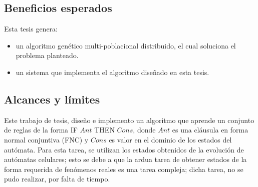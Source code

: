 \subsection{Beneficios esperados}
Esta tesis genera:
\begin{itemize}
	\item un algoritmo genético multi-poblacional distribuido, el cual soluciona el problema planteado.
	\item un sistema que implementa el algoritmo diseñado en esta tesis.
\end{itemize}

\subsection{Alcances y límites}
Este trabajo de tesis, diseño e implemento un algoritmo que aprende un conjunto de reglas de la forma IF $Ant$ THEN $Cons$, donde $Ant$ es una cláusula en forma normal conjuntiva (FNC) y $Cons$ es valor en el dominio de los estados del autómata. Para esta tarea, se utilizan los estados obtenidos de la evolución de autómatas celulares; esto se debe a que la ardua tarea de obtener estados de la forma requerida de fenómenos reales es una tarea compleja; dicha tarea, no se pudo realizar, por falta de tiempo.


